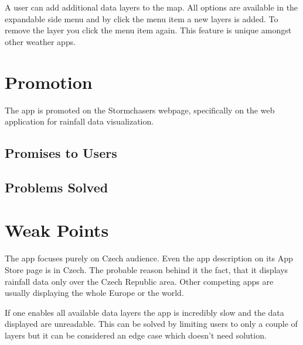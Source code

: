 \documentclass[11pt,a4paper]{article}
\begin{document}
A user can add additional data layers to the map. All options are available in the expandable side menu and by click the menu item a new layers is added. To remove the layer you click the menu item again. This feature is unique amongst other weather apps. 
\section{Promotion}

The app is promoted on the Stormchasers webpage, specifically on the web application for rainfall data visualization\cite{radarbourky}.

\subsection{Promises to Users}

\subsection{Problems Solved}

\section{Weak Points}

The app focuses purely on Czech audience. Even the app description on its App Store page is in Czech. The probable reason behind it the fact, that it displays rainfall data only over the Czech Republic area. Other competing apps are usually displaying the whole Europe or the world.

If one enables all available data layers the app is incredibly slow and the data displayed are unreadable. This can be solved by limiting users to only a couple of layers but it can be considered an edge case which doesn't need solution.
\end{document}
